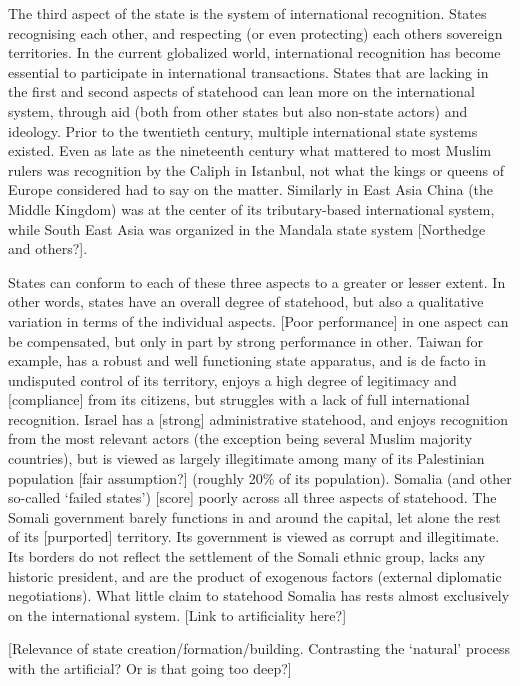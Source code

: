 \documentclass[12pt]{article}
\begin{document}
The third aspect of the state is the system of international recognition. States
recognising each other, and respecting (or even protecting) each others
sovereign territories. In the current globalized world, international
recognition has become essential to participate in international transactions.
States that are lacking in the first and second aspects of statehood can lean
more on the international system, through aid (both from other states but also
non-state actors) and ideology. Prior to the twentieth century, multiple
international state systems existed. Even as late as the nineteenth century what
mattered to most Muslim rulers was recognition by the Caliph in Istanbul, not
what the kings or queens of Europe considered had to say on the matter.
Similarly in East Asia China (the Middle Kingdom) was at the center of its
tributary-based international system, while South East Asia was organized in the
Mandala state system [Northedge and others?].

States can conform to each of these three aspects to a greater or lesser extent.
In other words, states have an overall degree of statehood, but also a
qualitative variation in terms of the individual aspects. [Poor performance] in
one aspect can be compensated, but only in part by strong performance in other.
Taiwan for example, has a robust and well functioning state apparatus, and is de
facto in undisputed control of its territory, enjoys a high degree of legitimacy
and [compliance] from its citizens, but struggles with a lack of full
international recognition. Israel has a [strong] administrative statehood, and
enjoys recognition from the most relevant actors (the exception being several
Muslim majority countries), but is viewed as largely illegitimate among many of
its Palestinian population [fair assumption?] (roughly 20\% of its population).
Somalia (and other so-called `failed states') [score] poorly across all three
aspects of statehood. The Somali government barely functions in and around the
capital, let alone the rest of its [purported] territory. Its government is
viewed as corrupt and illegitimate. Its borders do not reflect the settlement of
the Somali ethnic group, lacks any historic president, and are the product of
exogenous factors (external diplomatic negotiations). What little claim to
statehood Somalia has rests almost exclusively on the international system.
[Link to artificiality here?]

[Relevance of state creation/formation/building. Contrasting the `natural'
process with the artificial? Or is that going too deep?] 
\end{document}
